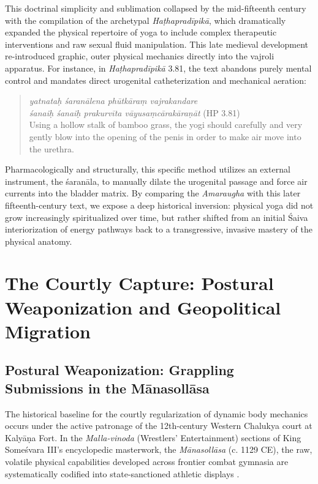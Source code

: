 \documentclass[11pt,twoside,letterpaper]{article}
\begin{document}
This doctrinal simplicity and sublimation collapsed by the mid-fifteenth century with the compilation of the archetypal \textit{Haṭhapradīpikā}, which dramatically expanded the physical repertoire of yoga to include complex therapeutic interventions and raw sexual fluid manipulation. This late medieval development re-introduced graphic, outer physical mechanics directly into the vajroli apparatus. For instance, in \textit{Haṭhapradīpikā} 3.81, the text abandons purely mental control and mandates direct urogenital catheterization and mechanical aeration:

\begin{quote}
\textit{yatnataḥ śaranālena phūtkāraṃ vajrakandare }\\
\textit{śanaiḥ śanaiḥ prakurvīta vāyusaṃcārakāraṇāt } (HP 3.81) \\
Using a hollow stalk of bamboo grass, the yogi should carefully and very gently blow
 into the opening of the penis in order to make air move into the urethra.
\end{quote}

Pharmacologically and structurally, this specific method utilizes an external instrument, the śaranāla, to manually dilate the urogenital passage and force air currents into the bladder matrix. By comparing the \textit{Amaraugha} with this later fifteenth-century text, we expose a deep historical inversion: physical yoga did not grow increasingly spiritualized over time, but rather shifted from an initial Śaiva interiorization of energy pathways back to a transgressive, invasive mastery of the physical anatomy.


\section{The Courtly Capture: Postural Weaponization and Geopolitical Migration}

\subsection{Postural Weaponization: Grappling Submissions in the Mānasollāsa}
The historical baseline for the courtly regularization of dynamic body mechanics occurs under the active patronage of the 12th-century Western Chalukya court at Kalyāṇa Fort. In the \textit{Malla-vinoda} (Wrestlers’ Entertainment) sections of King Someśvara III’s encyclopedic masterwork, the \textit{Mānasollāsa} (c. 1129 CE), the raw, volatile physical capabilities developed across frontier combat gymnasia are systematically codified into state-sanctioned athletic displays \citep{Manasollasa2}. 
\end{document}

